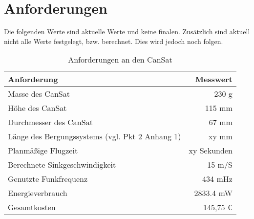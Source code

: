 \section{Anforderungen}
Die folgenden Werte sind aktuelle Werte und keine finalen. Zusätzlich sind aktuell nicht alle Werte festgelegt, bzw. berechnet. Dies wird jedoch noch folgen.
\begin{table}[htbp]
  \centering
    \begin{tabular}{l|r}
    \toprule
    \textbf{Anforderung} & \textbf{Messwert}  \\
    \midrule
    Masse des CanSat  & 230 g \\
    Höhe des CanSat	  & 115 mm\\
    Durchmesser des CanSat & 67 mm\\
	Länge des Bergungssystems (vgl. Pkt 2 Anhang 1)  & xy mm \\
	Planmäßige Flugzeit  & xy Sekunden \\
    Berechnete Sinkgeschwindigkeit  & 15 m/S \\
    Genutzte Funkfrequenz & 434 mHz \\
    Energieverbrauch & 2833.4 mW \\
    Gesamtkosten & 145,75 \euro \\
    \bottomrule
    \end{tabular}%
    \caption{Anforderungen an den CanSat}
  \label{tab:anforderungen}%
\end{table}%